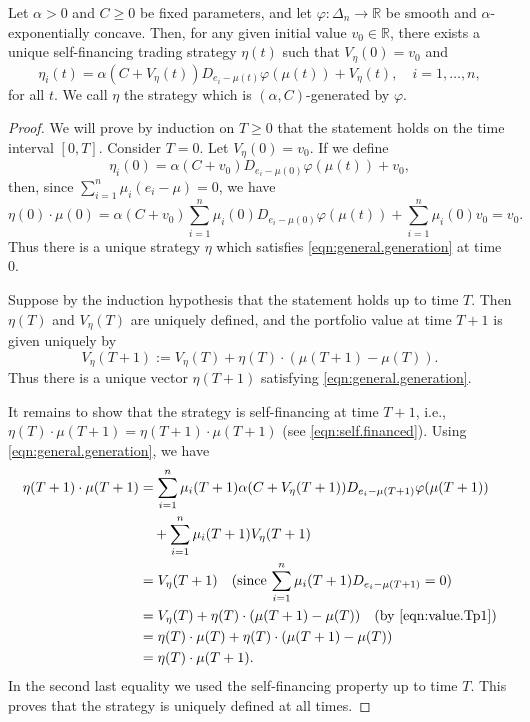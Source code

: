 \documentclass[graybox]{svmult}
\begin{document}
\begin{theorem}  \label{thm:genera.generation}
Let $\alpha > 0$ and $C \geq 0$ be fixed parameters, and let $\varphi: \Delta_n \rightarrow \mathbb{R}$ be smooth and $\alpha$-exponentially concave. Then, for any given initial value $v_0 \in \mathbb{R}$, there exists a unique self-financing trading strategy $\eta(t)$ such that $V_{\eta}(0) = v_0$ and
\begin{equation} \label{eqn:general.generation}
\eta_i(t) = \alpha (C + V_{\eta}(t)) D_{e_i - \mu(t)} \varphi(\mu(t)) + V_{\eta}(t), \quad i = 1, \ldots, n,
\end{equation}
for all $t$. We call $\eta$ the strategy which is $(\alpha, C)$-generated by $\varphi$.
\end{theorem}
\begin{proof}
We will prove by induction on $T \geq 0$ that the statement holds on the time interval $[0, T]$. Consider $T = 0$. Let $V_{\eta}(0) = v_0$. If we define
\[
\eta_i(0) = \alpha (C + v_0) D_{e_i - \mu(0)} \varphi(\mu(t)) +  v_0,
\]
then, since $\sum_{i = 1}^n \mu_i (e_i - \mu) = 0$, we have
\[
\eta(0) \cdot \mu(0) = \alpha (C + v_0) \sum_{i = 1}^n \mu_i(0) D_{e_i - \mu(0)} \varphi(\mu(t)) +  \sum_{i = 1}^n \mu_i(0) v_0 = v_0.
\]
Thus there is a unique strategy $\eta$ which satisfies \eqref{eqn:general.generation} at time $0$.

Suppose by the induction hypothesis that the statement holds up to time $T$. Then $\eta(T)$ and $V_{\eta}(T)$ are uniquely defined, and the portfolio value at time $T + 1$ is given uniquely by
\begin{equation} \label{eqn:value.Tp1}
V_{\eta}(T + 1) := V_{\eta}(T) + \eta(T) \cdot (\mu(T + 1) - \mu(T)).
\end{equation}
Thus there is a unique vector $\eta(T + 1)$ satisfying \eqref{eqn:general.generation}. 

It remains to show that the strategy is self-financing at time $T + 1$, i.e., $\eta(T) \cdot \mu(T + 1) = \eta(T + 1) \cdot \mu(T + 1)$ (see \eqref{eqn:self.financed}). Using \eqref{eqn:general.generation}, we have
\begin{equation*}
\begin{split}
\eta(T + 1) \cdot \mu(T + 1) &= \sum_{i = 1}^n \mu_i(T + 1) \alpha (C + V_{\eta}(T + 1)) D_{e_i - \mu(T + 1)} \varphi(\mu(T + 1)) \\
&\quad + \sum_{i = 1}^n \mu_i(T + 1) V_{\eta}(T + 1) \\
&= V_{\eta}(T + 1) \quad \text{(since $\sum_{i = 1}^n \mu_i(T + 1) D_{e_i - \mu(T + 1)} = 0$)} \\
&= V_{\eta}(T) + \eta(T) \cdot (\mu(T + 1) - \mu(T)) \quad \text{(by \eqref{eqn:value.Tp1})} \\
&= \eta(T) \cdot \mu(T) + \eta(T) \cdot (\mu(T + 1) - \mu(T)) \\
&= \eta(T) \cdot \mu(T + 1).
\end{split}
\end{equation*}
In the second last equality we used the self-financing property up to time $T$. This proves that the strategy is uniquely defined at all times.
\end{proof}
\end{document}
